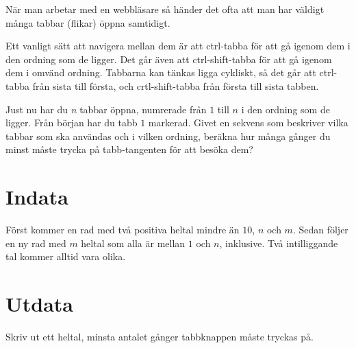 
När man arbetar med en webbläsare så händer det ofta att man har väldigt många
tabbar (flikar) öppna samtidigt.

Ett vanligt sätt att navigera mellan dem är att ctrl-tabba för att gå igenom dem i
den ordning som de ligger. Det går även att ctrl-shift-tabba för att gå igenom
dem i omvänd ordning. Tabbarna kan tänkas ligga cykliskt, så det går att ctrl-tabba från sista till första, och crtl-shift-tabba från första till sista tabben. 

Just nu har du \emph{n} tabbar öppna, numrerade från $1$ till $n$ i den ordning
som de ligger. Från början har du tabb $1$ markerad. Givet en sekvens som
beskriver vilka tabbar som ska användas och i vilken ordning, beräkna hur många gånger
du minst måste trycka på tabb-tangenten för att besöka dem?

\section*{Indata}

Först kommer en rad med två positiva heltal mindre än $10$, $n$ och $m$. Sedan
följer en ny rad med $m$ heltal som alla är mellan $1$ och $n$, inklusive. Två
intilliggande tal kommer alltid vara olika.

\section*{Utdata}

Skriv ut ett heltal, minsta antalet gånger tabbknappen måste tryckas på.

